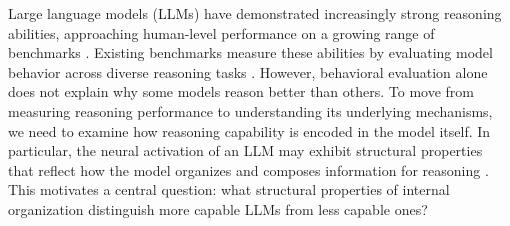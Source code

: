 Large language models (LLMs) have demonstrated increasingly strong reasoning abilities, approaching human-level performance on a growing range of benchmarks \cite{leon2025gpt, liu2025deepseek, gardinazzi2024persistent}. Existing benchmarks measure these abilities by evaluating model behavior across diverse reasoning tasks \cite{wang2024mmlu, kaplan2020scaling, schaeffer2023emergent}. However, behavioral evaluation alone does not explain why some models reason better than others. To move from measuring reasoning performance to understanding its underlying mechanisms, we need to examine how reasoning capability is encoded in the model itself. In particular, the neural activation
of an LLM may exhibit structural properties that reflect how the model organizes and composes information for reasoning \cite{zhang2024interpreting, rai2024practical}. This motivates a central question: what structural properties of internal organization distinguish more capable LLMs from less capable ones?



